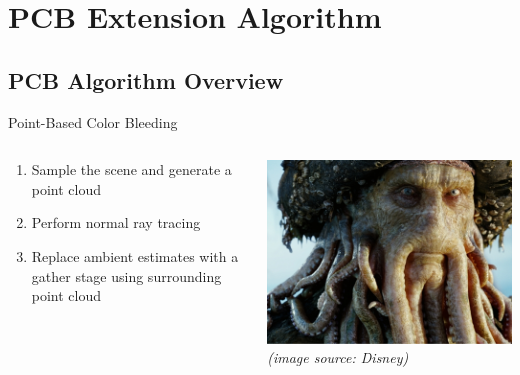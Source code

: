 \documentclass[10pt,compress,professionalfont]{beamer}
\begin{document}
\section{PCB Extension Algorithm}
\subsection{PCB Algorithm Overview}
\begin{frame}{Point-Based Color Bleeding}



    \begin{columns}
        \begin{column}{0.6\textwidth}
            \begin{enumerate}
                \item Sample the scene and generate a point cloud
                \item Perform normal ray tracing
                \item Replace ambient estimates with a gather stage using surrounding point cloud
            \end{enumerate}
        \end{column}
        \begin{column}{0.4\textwidth}
            {\centering
                \includegraphics[width=\textwidth]{../img/external/davyjones}\\
                \scriptsize\textit{(image source: Disney)}
            }
        \end{column}
    \end{columns}
\end{frame}
\end{document}
